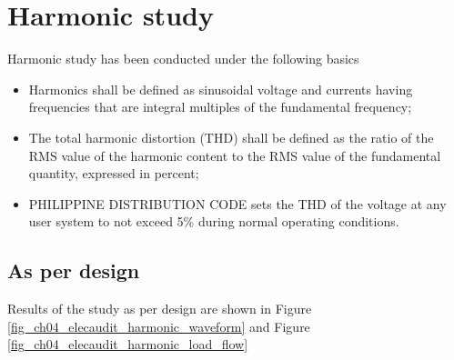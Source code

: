 %
\section{Harmonic study} \label{ch04_elecaudit_harmonicstudy}
Harmonic study has been conducted under the following basics
\begin{itemize}
\item Harmonics shall be defined as sinusoidal voltage and currents having frequencies that are integral multiples of the fundamental frequency;

\item The total harmonic distortion (THD) shall be defined as the ratio of the RMS value of the harmonic content to the RMS value of the fundamental quantity, expressed in percent;

\item PHILIPPINE DISTRIBUTION CODE sets the THD of the voltage at any user 	system to not exceed 5\% during normal operating conditions.
\end{itemize}

\subsection{As per design}
Results of the study as per design are shown in Figure \ref{fig_ch04_elecaudit_harmonic_waveform} and Figure \ref{fig_ch04_elecaudit_harmonic_load_flow}


